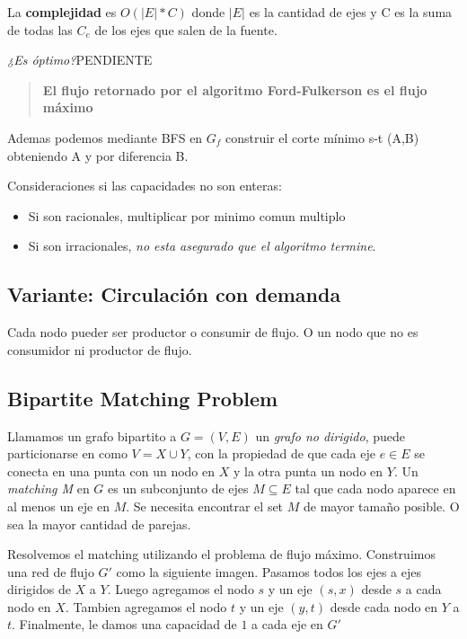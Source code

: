 \documentclass{article}
\begin{document}
La \textbf{complejidad} es \(O(|E|*C)\) donde \(|E|\) es la cantidad de ejes y C es la suma de todas
las \(C_e\) de los ejes que salen de la fuente.


\textit{¿Es óptimo?}PENDIENTE

\begin{quote}
    \textbf{El flujo retornado por el algoritmo Ford-Fulkerson es el flujo máximo}
\end{quote}

Ademas podemos mediante BFS en \(G_f\) construir el corte mínimo s-t (A,B) obteniendo A y por diferencia B.

Consideraciones si las capacidades no son enteras:
\begin{itemize}
    \item Si son racionales, multiplicar por minimo comun multiplo
    \item Si son irracionales, \textit{no esta asegurado que el algoritmo termine}.
\end{itemize}

\subsection{Variante: Circulación con demanda}

Cada nodo pueder ser productor o consumir de flujo. O un nodo que no es consumidor ni productor de flujo.

\newpage
\subsection{Bipartite Matching Problem}

Llamamos un grafo bipartito a \(G=(V,E)\) un \textit{grafo no dirigido}, puede particionarse en 
como \(V=X \cup Y\), con la propiedad de que cada eje \(e \in E\) se conecta en una punta con
un nodo en \(X\) y la otra punta un nodo en \(Y\). Un \textit{matching M} en \(G\) es un subconjunto
de ejes \(M \subseteq E\) tal que cada nodo aparece en al menos un eje en \(M\).
Se necesita encontrar el set \(M\) de mayor tamaño posible. O sea la mayor cantidad de parejas.


Resolvemos el matching utilizando el problema de flujo máximo.
Construimos una red de flujo \(G'\) como la siguiente imagen. Pasamos todos los ejes a ejes dirigidos de
\(X\) a \(Y\). Luego agregamos el nodo \(s\) y un eje \((s,x)\) desde \(s\) a cada nodo en \(X\). 
Tambien agregamos el nodo \(t\) y un eje \((y,t)\) desde cada nodo en \(Y\) a \(t\).
Finalmente, le damos una capacidad de \(1\) a cada eje en \(G'\)
\end{document}
